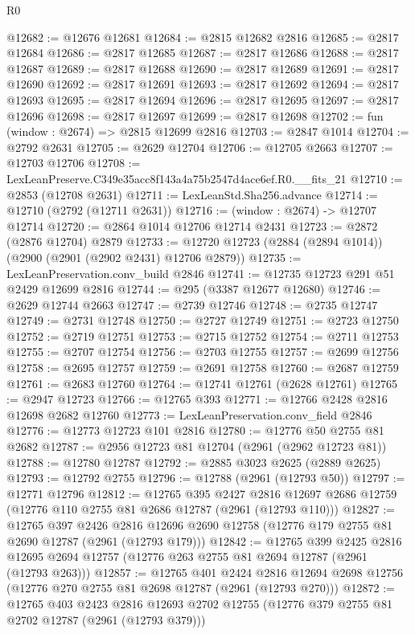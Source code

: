 \begin{lexlean}{R0}
\begin{coremodule}
@12682 := @12676 @12681
@12684 := @2815 @12682 @2816
@12685 := @2817 @12684
@12686 := @2817 @12685
@12687 := @2817 @12686
@12688 := @2817 @12687
@12689 := @2817 @12688
@12690 := @2817 @12689
@12691 := @2817 @12690
@12692 := @2817 @12691
@12693 := @2817 @12692
@12694 := @2817 @12693
@12695 := @2817 @12694
@12696 := @2817 @12695
@12697 := @2817 @12696
@12698 := @2817 @12697
@12699 := @2817 @12698
@12702 := fun (window : @2674) => @2815 @12699 @2816
@12703 := @2847 @1014
@12704 := @2792 @2631
@12705 := @2629 @12704
@12706 := @12705 @2663
@12707 := @12703 @12706
@12708 := LexLeanPreserve.C349e35acc8f143a4a75b2547d4ace6ef.R0.__fits_21
@12710 := @2853 (@12708 @2631)
@12711 := LexLeanStd.Sha256.advance
@12714 := @12710 (@2792 (@12711 @2631))
@12716 := (window : @2674) -> @12707 @12714
@12720 := @2864 @1014 @12706 @12714 @2431
@12723 := @2872 (@2876 @12704) @2879
@12733 := @12720 @12723 (@2884 (@2894 @1014)) (@2900 (@2901 (@2902 @2431) @12706 @2879))
@12735 := LexLeanPreservation.conv_build @2846
@12741 := @12735 @12723 @291 @51 @2429 @12699 @2816
@12744 := @295 (@3387 @12677 @12680)
@12746 := @2629 @12744 @2663
@12747 := @2739 @12746
@12748 := @2735 @12747
@12749 := @2731 @12748
@12750 := @2727 @12749
@12751 := @2723 @12750
@12752 := @2719 @12751
@12753 := @2715 @12752
@12754 := @2711 @12753
@12755 := @2707 @12754
@12756 := @2703 @12755
@12757 := @2699 @12756
@12758 := @2695 @12757
@12759 := @2691 @12758
@12760 := @2687 @12759
@12761 := @2683 @12760
@12764 := @12741 @12761 (@2628 @12761)
@12765 := @2947 @12723
@12766 := @12765 @393
@12771 := @12766 @2428 @2816 @12698 @2682 @12760
@12773 := LexLeanPreservation.conv_field @2846
@12776 := @12773 @12723 @101 @2816
@12780 := @12776 @50 @2755 @81 @2682
@12787 := @2956 @12723 @81 @12704 (@2961 (@2962 @12723 @81))
@12788 := @12780 @12787
@12792 := @2885 @3023 @2625 (@2889 @2625)
@12793 := @12792 @2755
@12796 := @12788 (@2961 (@12793 @50))
@12797 := @12771 @12796
@12812 := @12765
    @395
    @2427
    @2816
    @12697
    @2686
    @12759
    (@12776 @110 @2755 @81 @2686 @12787 (@2961 (@12793 @110)))
@12827 := @12765
    @397
    @2426
    @2816
    @12696
    @2690
    @12758
    (@12776 @179 @2755 @81 @2690 @12787 (@2961 (@12793 @179)))
@12842 := @12765
    @399
    @2425
    @2816
    @12695
    @2694
    @12757
    (@12776 @263 @2755 @81 @2694 @12787 (@2961 (@12793 @263)))
@12857 := @12765
    @401
    @2424
    @2816
    @12694
    @2698
    @12756
    (@12776 @270 @2755 @81 @2698 @12787 (@2961 (@12793 @270)))
@12872 := @12765
    @403
    @2423
    @2816
    @12693
    @2702
    @12755
    (@12776 @379 @2755 @81 @2702 @12787 (@2961 (@12793 @379)))

\end{coremodule}
\end{lexlean}
